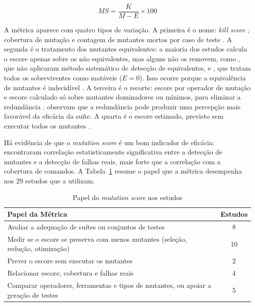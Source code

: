 \begin{equation}
    MS = \frac{K}{M - E} \times 100
    \label{eq:mutation-score}
\end{equation}

A métrica aparece com quatro tipos de variação. A primeira é o nome: \textit{kill score} \cite{inozemtseva2013}, cobertura de mutação \cite{alenezi2016, grano2019} e contagem de mutantes mortos por caso de teste \cite{dimov2010}. A segunda é o tratamento dos mutantes equivalentes: a maioria dos estudos calcula o escore apenas sobre os não equivalentes, mas alguns não os removem, como , que não aplicaram método sistemático de detecção de equivalentes, e , que tratam todos os sobreviventes como matáveis ($E = 0$). Isso ocorre porque a equivalência de mutantes é indecidível \cite{yao2014}. A terceira é o recorte: escore por operador de mutação \cite{belli2011, yandrapally2021} e escore calculado só sobre mutantes dominadores ou mínimos, para eliminar a redundância \cite{kurtz2016, kuroishi2020}.  observam que a redundância pode produzir uma percepção mais favorável da eficácia da suíte. A quarta é o escore estimado, previsto sem executar todos os mutantes \cite{jalbert2012, zhang2019}.

Há evidência de que o \textit{mutation score} é um bom indicador de eficácia:  encontraram correlação estatisticamente significativa entre a detecção de mutantes e a detecção de falhas reais, mais forte que a correlação com a cobertura de comandos. A Tabela~\ref{tab:papel-mutation-score} resume o papel que a métrica desempenha nos 29 estudos que a utilizam.

\begin{table}[H]
    \centering
    \caption{Papel do \textit{mutation score} nos estudos}
    \label{tab:papel-mutation-score}
    \begin{tabular}{|p{11.5cm}|c|}
        \hline
        \textbf{Papel da Métrica} & \textbf{Estudos} \\
        \hline
        Avaliar a adequação de suítes ou conjuntos de testes & 8 \\
        \hline
        Medir se o escore se preserva com menos mutantes (seleção, redução, otimização) & 10 \\
        \hline
        Prever o escore sem executar os mutantes & 2 \\
        \hline
        Relacionar escore, cobertura e falhas reais & 4 \\
        \hline
        Comparar operadores, ferramentas e tipos de mutantes, ou apoiar a geração de testes & 5 \\
        \hline
    \end{tabular}
\end{table}

